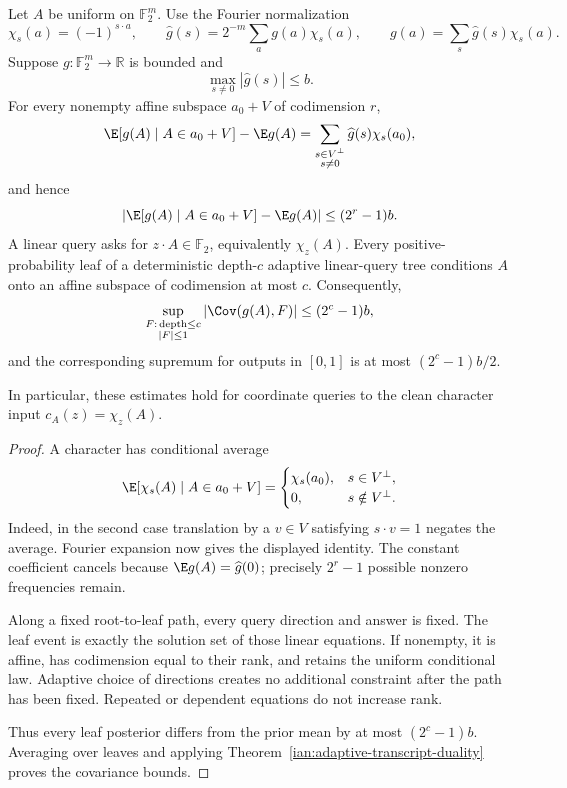 \begin{lemma}\label{ian:adaptive-character-affine-leaf}
Let \(A\) be uniform on \(\mathbb F_2^m\). Use the Fourier normalization
\[
 \chi_s(a)=(-1)^{s\cdot a},
 \qquad
 \widehat g(s)=2^{-m}\sum_a g(a)\chi_s(a),
 \qquad
 g(a)=\sum_s\widehat g(s)\chi_s(a).
\]
Suppose \(g:\mathbb F_2^m\to\mathbb R\) is bounded and
\[
 \max_{s\ne0}|\widehat g(s)|\le b.
\]
For every nonempty affine subspace \(a_0+V\) of codimension \(r\),
\[
 \E[g(A)\mid A\in a_0+V]-\E g(A)
 =
 \sum_{\substack{s\in V^\perp\\s\ne0}}
 \widehat g(s)\chi_s(a_0),
\]
and hence
\[
 \left|\E[g(A)\mid A\in a_0+V]-\E g(A)\right|
 \le(2^r-1)b.
\]
A linear query asks for \(z\cdot A\in\mathbb F_2\), equivalently \(\chi_z(A)\).
Every positive-probability leaf of a deterministic depth-\(c\) adaptive linear-query tree conditions \(A\) onto an affine subspace of codimension at most \(c\). Consequently,
\[
 \sup_{\substack{F:\,\mathrm{depth}\le c\\|F|\le1}}
 |\Cov(g(A),F)|
 \le(2^c-1)b,
\]
and the corresponding supremum for outputs in \([0,1]\) is at most
\((2^c-1)b/2\).

In particular, these estimates hold for coordinate queries to the clean character input
\(c_A(z)=\chi_z(A)\).
\end{lemma}
\begin{proof}
A character has conditional average
\[
 \E[\chi_s(A)\mid A\in a_0+V]
 =
 \begin{cases}
 \chi_s(a_0),&s\in V^\perp,\\
 0,&s\notin V^\perp.
 \end{cases}
\]
Indeed, in the second case translation by a \(v\in V\) satisfying \(s\cdot v=1\) negates the average. Fourier expansion now gives the displayed identity. The constant coefficient cancels because \(\E g(A)=\widehat g(0)\); precisely \(2^r-1\) possible nonzero frequencies remain.

Along a fixed root-to-leaf path, every query direction and answer is fixed. The leaf event is exactly the solution set of those linear equations. If nonempty, it is affine, has codimension equal to their rank, and retains the uniform conditional law. Adaptive choice of directions creates no additional constraint after the path has been fixed. Repeated or dependent equations do not increase rank.

Thus every leaf posterior differs from the prior mean by at most \((2^c-1)b\). Averaging over leaves and applying Theorem~\ref{ian:adaptive-transcript-duality} proves the covariance bounds.
\end{proof}

